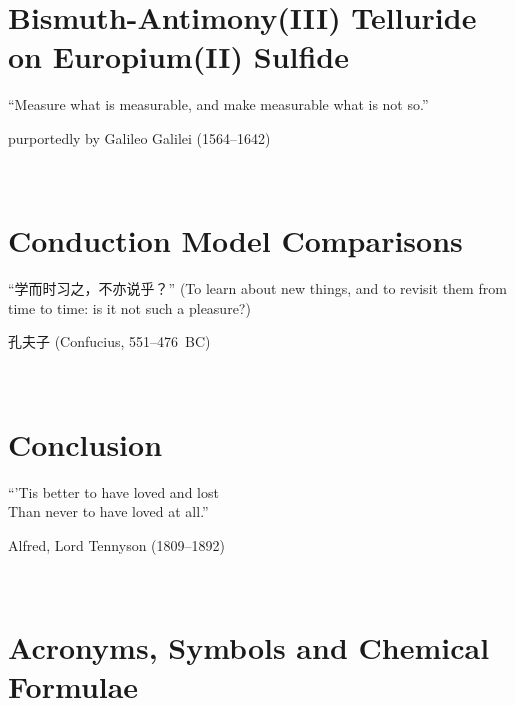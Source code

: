 ﻿\documentclass{report}
\begin{document}
\chapter{Bismuth-Antimony(III) Telluride on Europium(II) Sulfide}\label{ch:bilayer2018}
\begin{refsection}
\epigraph{``Measure what is measurable, and make measurable what is not so.''}{purportedly by Galileo Galilei (1564--1642)}~\\
    
    \printbibliography[heading=subbibintoc, title=References]
\end{refsection}

\chapter{Conduction Model Comparisons}\label{ch:models}
\begin{refsection}
    \begin{CJK*}{UTF8}{gkai}
    \epigraph{``学而时习之，不亦说乎？'' (To learn about new things, and to revisit them from time to time: is it not such a pleasure?)}{孔夫子 (Confucius, 551--476~BC)}~\\
    \end{CJK*}
    
    \printbibliography[heading=subbibintoc, title=References]
\end{refsection}

\chapter{Conclusion}\label{ch:conclusion}
\epigraph{``'Tis better to have loved and lost\\Than never to have loved at all.''}{Alfred, Lord Tennyson (1809--1892)}~\\
    
    \printbibliography[heading=subbibintoc, title=References]
\appendix
%
%
\chapter{Acronyms, Symbols and Chemical Formulae}
    
\end{document}
